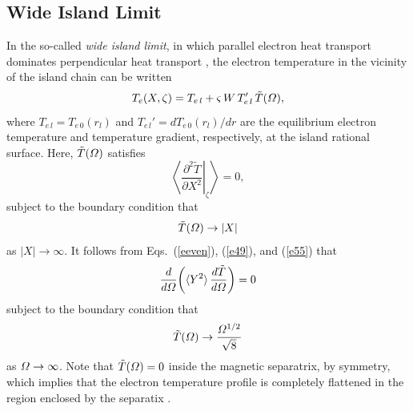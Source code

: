 \documentclass{iopjournal}
\begin{document}
{\subsection{Wide Island Limit}
In the so-called {\em wide island limit}, in which parallel electron heat transport dominates perpendicular heat transport \cite{ntm2,island},
the electron temperature in the vicinity of the island chain can be written
\begin{equation}
T_e(X,\zeta) = T_{e\,l} + \varsigma\,W\,T_{e\,l}'\,\tilde{T}({\mit\Omega}),
\end{equation}
where $T_{e\,l}= T_{e\,0}(r_l)$ and $T_{e\,l}' = dT_{e\,0}(r_l)/dr$ are the equilibrium electron temperature and  temperature
gradient, respectively, at the island rational surface. 
Here, 
$\tilde{T}({\mit\Omega})$ satisfies \cite{ntm2}
\begin{equation}\label{e30}
\left\langle \left.\frac{\partial ^2\tilde{T}}{\partial X^2}\right|_\zeta \right\rangle =0,
\end{equation}
subject to the boundary condition that
\begin{equation}
\tilde{T}({\mit\Omega})\rightarrow |X|
\end{equation}
as $|X|\rightarrow \infty$. It
follows  from Eqs.~(\ref{eeven}), (\ref{e49}), and (\ref{e55})  that
\begin{equation}\label{e34}
\frac{d}{d{\mit\Omega}}\!\left(\langle Y^2\rangle\,\frac{d\tilde{T}}{d{\mit\Omega}}\right)=0
\end{equation}
subject to the boundary condition that
\begin{equation}
\tilde{T}({\mit\Omega})\rightarrow \frac{{\mit\Omega}^{1/2}}{\sqrt{8}}
\end{equation}
as ${\mit\Omega}\rightarrow\infty$. Note that $\tilde{T}({\mit\Omega})=0$ inside the magnetic separatrix, by symmetry, which implies that the electron
temperature profile is completely flattened in the region enclosed  by the separatix \cite{ntm2}.

}
\end{document}
